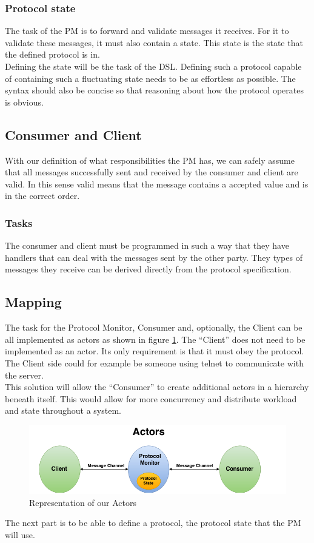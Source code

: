 \subsubsection{Protocol state}
The task of the PM is to forward and validate messages it receives. For it to validate these messages, it must also contain a state. This state is the state that the defined protocol is in.
\\
Defining the state will be the task of the DSL. Defining such a protocol capable of containing such a fluctuating state needs to be as effortless as possible. The syntax should also be concise so that reasoning about how the protocol operates is obvious.

\subsection{Consumer and Client}
With our definition of what responsibilities the PM has, we can safely assume that all messages successfully sent and received by the consumer and client are valid. In this sense valid means that the message contains a accepted value and is in the correct order.
\subsubsection{Tasks}
The consumer and client must be programmed in such a way that they have handlers that can deal with the messages sent by the other party. They types of messages they receive can be derived directly from the protocol specification. 


\subsection{Mapping}
The task for the Protocol Monitor, Consumer and, optionally, the Client can be all implemented as actors as shown in figure \ref{fig:ArchitectureMapping}. The ``Client'' does not need to be implemented as an actor. Its only requirement is that it must obey the protocol. The Client side could for example be someone using telnet to communicate with the server.
\\
This solution will allow the ``Consumer'' to create additional actors in a hierarchy beneath itself. This would allow for more concurrency and distribute workload and state throughout a system. 
\begin{figure}[h]
	\centering
	\includegraphics[scale=0.45]{images/architecture/ArchitectureMapping.png} 
	\caption{Representation of our Actors}
	\label{fig:ArchitectureMapping}
\end{figure}

The next part is to be able to define a protocol, the protocol state that the PM will use.






















